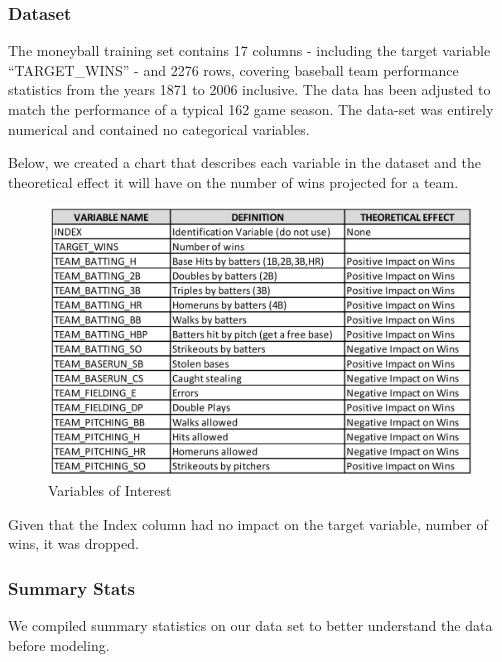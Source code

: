 \documentclass[
]{article}
\begin{document}
\hypertarget{dataset}{%
\subsubsection{Dataset}\label{dataset}}

The moneyball training set contains 17 columns - including the target
variable ``TARGET\_WINS'' - and 2276 rows, covering baseball team
performance statistics from the years 1871 to 2006 inclusive. The data
has been adjusted to match the performance of a typical 162 game season.
The data-set was entirely numerical and contained no categorical
variables.

Below, we created a chart that describes each variable in the dataset
and the theoretical effect it will have on the number of wins projected
for a team.

\begin{figure}
\centering
\includegraphics{./figures/Variables.png}
\caption{Variables of Interest}
\end{figure}

Given that the Index column had no impact on the target variable, number
of wins, it was dropped.

\hypertarget{summary-stats}{%
\subsubsection{Summary Stats}\label{summary-stats}}

We compiled summary statistics on our data set to better understand the
data before modeling.
\end{document}
